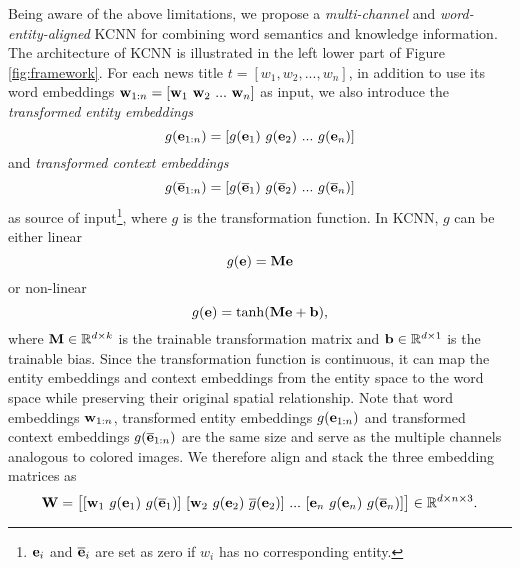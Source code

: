 \documentclass[sigconf]{acmart}
\begin{document}
		Being aware of the above limitations, we propose a \textit{multi-channel} and \textit{word-entity-aligned} KCNN for combining word semantics and knowledge information.
		The architecture of KCNN is illustrated in the left lower part of Figure \ref{fig:framework}.
		For each news title $t = [w_1, w_2, ..., w_n]$, in addition to use its word embeddings ${\bf w}_{1:n} = [{\bf w}_1 \ {\bf w}_2 \ ... \ {\bf w}_n]$ as input, we also introduce the \textit{transformed entity embeddings}
		\begin{equation}
			g({\bf e}_{1:n}) = [g({\bf e}_1) \ g({\bf e}_2) \ ... \ g({\bf e}_n)]
		\end{equation}
		and \textit{transformed context embeddings}
		\begin{equation}
			g(\overline {\bf e}_{1:n}) = [g(\overline {\bf e}_1) \ g(\overline {\bf e}_2) \ ... \ g(\overline {\bf e}_n)]
		\end{equation}
		as source of input\footnote{${\bf e}_i$ and $\overline {\bf e}_i$ are set as zero if $w_i$ has no corresponding entity.}, where $g$ is the transformation function.
		In KCNN, $g$ can be either linear
		\begin{equation}
			g(\bf e) = M e
		\end{equation}
		or non-linear
		\begin{equation}
		\label{eq:nonlinear}
			g(\bf e) = \tanh(M e + b),
		\end{equation}
		where ${\bf M} \in \mathbb R^{d \times k}$ is the trainable transformation matrix and ${\bf b} \in \mathbb R^{d \times 1}$ is the trainable bias.
		Since the transformation function is continuous, it can map the entity embeddings and context embeddings from the entity space to the word space while preserving their original spatial relationship.
		Note that word embeddings ${\bf w}_{1:n}$, transformed entity embeddings $g({\bf e}_{1:n})$ and transformed context embeddings $g(\overline {\bf e}_{1:n})$ are the same size and serve as the multiple channels analogous to colored images. We therefore align and stack the three embedding matrices as
		\begin{equation}
			{\bf W} = \big[ [{\bf w}_1 \ g({\bf e}_1) \ g(\overline{\bf e}_1)] \ [{\bf w}_2 \ g({\bf e}_2) \ \overline g({\bf e}_2)] \ ... \ [{\bf e}_n \ g({\bf e}_n) \ g(\overline {\bf e}_n)] \big] \in \mathbb R^{d \times n \times 3}.
		\end{equation}
		
\end{document}

